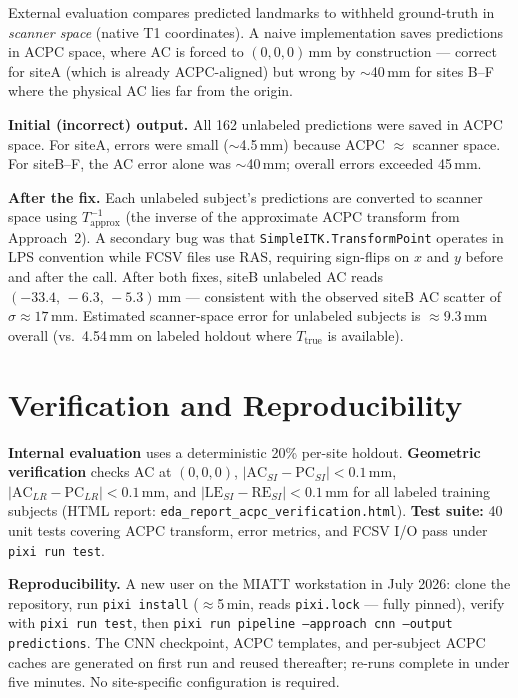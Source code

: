 \documentclass[11pt,letterpaper]{article}
\begin{document}
External evaluation compares predicted landmarks to withheld ground-truth in \emph{scanner
space} (native T1 coordinates).
A naive implementation saves predictions in ACPC space, where AC is forced to
$(0,0,0)$\,mm by construction — correct for siteA (which is already ACPC-aligned) but
wrong by $\sim$40\,mm for sites B--F where the physical AC lies far from the origin.

\textbf{Initial (incorrect) output.}
All 162 unlabeled predictions were saved in ACPC space.
For siteA, errors were small ($\sim$4.5\,mm) because ACPC $\approx$ scanner space.
For siteB--F, the AC error alone was $\sim$40\,mm; overall errors exceeded 45\,mm.

\textbf{After the fix.}
Each unlabeled subject's predictions are converted to scanner space using
$T_\text{approx}^{-1}$ (the inverse of the approximate ACPC transform from Approach~2).
A secondary bug was that \texttt{SimpleITK.TransformPoint} operates in LPS convention while
FCSV files use RAS, requiring sign-flips on $x$ and $y$ before and after the call.
After both fixes, siteB unlabeled AC reads $(-33.4,\,-6.3,\,-5.3)\,\text{mm}$ — consistent
with the observed siteB AC scatter of $\sigma\approx17$\,mm.
Estimated scanner-space error for unlabeled subjects is $\approx$9.3\,mm overall
(vs.\ 4.54\,mm on labeled holdout where $T_\text{true}$ is available).

\section{Verification and Reproducibility}
\label{sec:verif}

\textbf{Internal evaluation} uses a deterministic 20\% per-site holdout.
\textbf{Geometric verification} checks AC at $(0,0,0)$, $|\text{AC}_{SI}-\text{PC}_{SI}|<0.1\,\text{mm}$,
$|\text{AC}_{LR}-\text{PC}_{LR}|<0.1\,\text{mm}$, and $|\text{LE}_{SI}-\text{RE}_{SI}|<0.1\,\text{mm}$
for all labeled training subjects (HTML report: \texttt{eda\_report\_acpc\_verification.html}).
\textbf{Test suite:} 40 unit tests covering ACPC transform, error metrics, and FCSV I/O
pass under \texttt{pixi run test}.

\textbf{Reproducibility.}
A new user on the MIATT workstation in July 2026: clone the repository, run
\texttt{pixi install} ($\approx$5\,min, reads \texttt{pixi.lock} — fully pinned), verify with
\texttt{pixi run test}, then \texttt{pixi run pipeline --approach cnn --output predictions}.
The CNN checkpoint, ACPC templates, and per-subject ACPC caches are generated on first run
and reused thereafter; re-runs complete in under five minutes.
No site-specific configuration is required.
\end{document}
